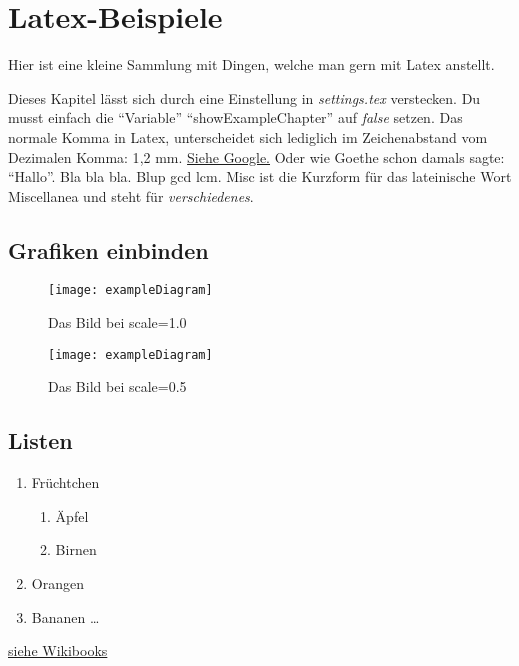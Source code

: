 \chapter{Latex-Beispiele}
Hier ist eine kleine Sammlung mit Dingen, welche man gern mit Latex anstellt.\par
Dieses Kapitel lässt sich durch eine Einstellung in \emph{settings.tex} verstecken.
Du musst einfach die "`Variable"' \enquote{showExampleChapter} auf \emph{false} setzen.
Das normale Komma in Latex, unterscheidet sich lediglich im Zeichenabstand
vom Dezimalen Komma: 1{,}2 mm. \href{http://google.de}{Siehe Google.}
Oder wie Goethe schon damals sagte: "`Hallo"'\cite[chapter, p.~215]{goethe2016wilhelm}.
Bla bla bla. \parencite[see][p10]{lamport1994latex} Blup \acrlong{gcd} \acrshort{lcm}.
Misc ist die Kurzform für das lateinische Wort Miscellanea und steht
für \emph{verschiedenes}.\cite{wiki:misc}

\section{Grafiken einbinden}

\begin{figure}[ht]
\centering
\texttt{[image: exampleDiagram]}
\caption{Das Bild bei scale=1.0}
\label{fig: LogoGross}
\end{figure}

\begin{figure}[ht]
\centering
\texttt{[image: exampleDiagram]}
\caption{Das Bild bei scale=0.5}
\label{fig: LogoKleiner}
\end{figure}

\newpage

\section{Listen}

\begin{enumerate}
\item Früchtchen
\begin{enumerate}
\item Äpfel
\item Birnen
\end{enumerate}
\item Orangen
\item Bananen \ldots
\end{enumerate}

\href{https://en.wikibooks.org/wiki/LaTeX/List_Structures}{siehe Wikibooks}

